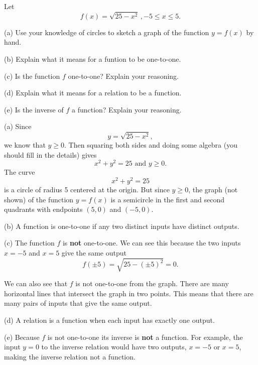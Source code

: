 \documentclass{ximera}
\begin{document}
\begin{example}     \label{Ex99:Quadratics}
Let 
\[
   f(x) = \sqrt{25-x^2} \, , -5 \leq x \leq 5 .
\]

(a) Use your knowledge of circles to sketch a graph of the function $y=f(x)$ by hand.

(b) Explain what it means for a funtion to be one-to-one.

(c) Is the function $f$ one-to-one? Explain your reasoning.

(d) Explain what it means for a relation to be a function.

(e) Is the inverse of $f$ a function? Explain your reasoning.

\begin{explanation}

(a) Since 
\[
    y = \sqrt{25-x^2},
\]
we know that $y \geq 0$. Then squaring both sides and doing some algebra (you should fill in the details) gives
\[
    x^2 + y^2 =25 \text{ and } y\geq 0.
\]
The curve 
\[
   x^2 + y^2 = 25
\]
is a circle of radius 5 centered at the origin. But since $y\geq 0$, the graph (not shown) of the function $y=f(x)$ is a semicircle in the first and second quadrants with endpoints $(5,0)$ and $(-5,0)$.

(b) A function is one-to-one if any two distinct inputs have distinct outputs.

(c) The function $f$ is {\bf not} one-to-one. We can see this because the two inputs $x=-5$ and $x=5$ give the same output
\[
     f(\pm 5) = \sqrt{25-(\pm 5)^2} = 0 .
\]

We can also see that $f$ is not one-to-one from the graph. There are many horizontal lines that intersect the graph in two points. This means that there are many pairs of inputs that give the same output.

(d) A relation is a function when each input has exactly one output.

(e) Because $f$ is not one-to-one its inverse is {\bf not} a function. For example, the input $y=0$ to the inverse relation would have two outputs, $x=-5$ or $x=5$, making the inverse relation not a function.

\end{explanation}

\end{example}
\end{document}
